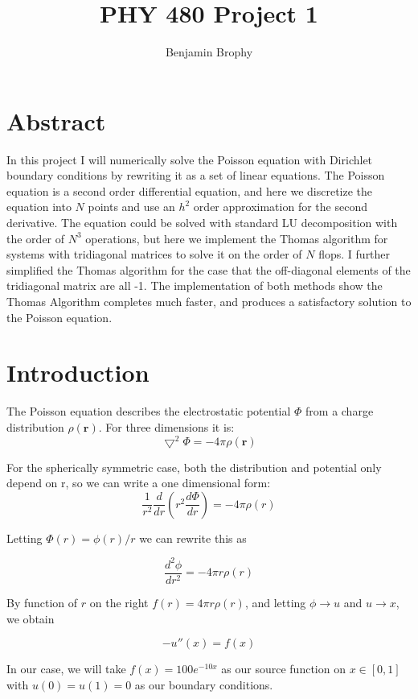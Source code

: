 \documentclass[11pt]{article}
\begin{document}
\title{PHY 480 Project 1}
\author{Benjamin Brophy}
\maketitle

\section{Abstract}

In this project I will numerically solve the Poisson equation with Dirichlet boundary conditions by rewriting it as a set of linear equations. The Poisson equation is a second order differential equation, and here we discretize the equation into $N$ points and use an $h^2$ order approximation for the second derivative. The equation could be solved with standard LU decomposition with the order of $N^3$ operations, but here we implement the Thomas algorithm for systems with tridiagonal matrices to solve it on the order of $N$ flops. I further simplified the Thomas algorithm for the case that the off-diagonal elements of the tridiagonal matrix are all -1. The implementation of both methods show the Thomas Algorithm completes much faster, and produces a satisfactory solution to the Poisson equation.

\section{Introduction}
The Poisson equation describes the electrostatic potential $\Phi$ from a charge distribution $\rho(\mathbf{r})$. For three dimensions it is:
$$ \bigtriangledown^2\Phi = -4\pi \rho (\mathbf{r})$$

For the spherically symmetric case, both the distribution and potential only depend on r, so we can write a one dimensional form:
$$\frac{1}{r^2}\frac{d}{dr}\left(r^2\frac{d\Phi}{dr}\right)=-4\pi\rho(r)$$

Letting $\Phi(r) = \phi(r)/r$ we can rewrite this as 

$$\frac{d^2\phi}{dr^2}=-4\pi r\rho(r)$$

By function of $r$ on the right $f(r)=4\pi r\rho(r)$,  and letting $\phi \rightarrow u$ and $u \rightarrow x$, we obtain

$$-u''(x)=f(x)$$

In our case, we will take $f(x)=100e^{-10x}$ as our source function on $x\in[0,1]$ with $u(0)=u(1)=0$ as our boundary conditions.
\end{document}
